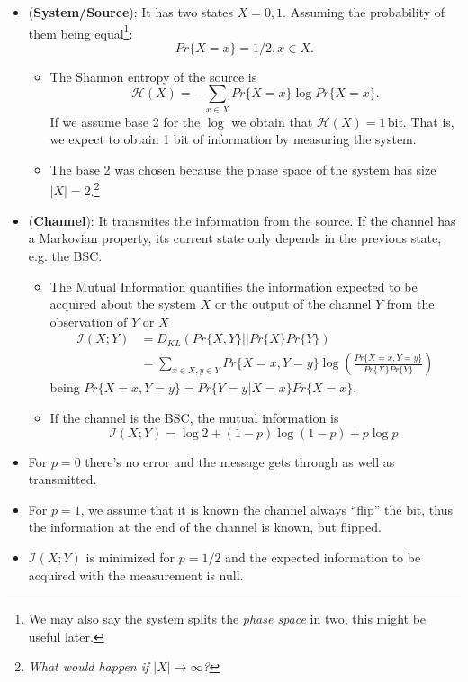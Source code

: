 \documentclass[11pt]{amsart}
\begin{document}
\begin{itemize}
\item ({\bf System/Source}): It has two states $X = {0,1}$. Assuming the probability of them being equal\footnote{We may also say the system splits the {\it phase space} in two, this might be useful later.}:
$$Pr\{X = x\} = 1/2, x \in X.$$
\begin{itemize}
\item The Shannon entropy of the source is 
$$\mathcal{H}(X) = -\sum_{x \in X} Pr\{X=x\} \log Pr\{X=x\}.$$
If we assume base 2 for the $\log$ we obtain that $\mathcal{H}(X) = 1 \, \text{bit}$. That is, we expect to obtain 1 bit of information by measuring the system.
\item The base 2 was chosen because the phase space of the system has size $|X|=2$.\footnote{{\it What would happen if $|X| \rightarrow\infty$?}}
\end{itemize}

\item ({\bf Channel}): It transmites the information from the source. If the channel has a Markovian property, its current state only depends in the previous state, e.g. the BSC.

\begin{itemize}
\item The Mutual Information quantifies the information expected to be acquired about the system $X$ or the output of the channel $Y$ from the observation of $Y$ or $X$
%
$$\begin{aligned}
\mathcal{I}(X;Y) &= D_{KL}(Pr\{X,Y\}||Pr\{X\}Pr\{Y\}) \\
&= \sum_{x \in X, y \in Y} Pr\{X=x, Y=y\} \log \left( \frac{Pr\{X=x, Y=y\}}{Pr\{X\}Pr\{Y\}} \right)
\end{aligned}
$$
being $Pr\{X=x, Y=y\} = Pr\{Y=y | X=x\} Pr\{X=x\}$.

\item If the channel is the BSC, the mutual information is
$$\mathcal{I}(X;Y) = \log 2 + (1-p) \log (1-p) + p \log p.$$
\end{itemize}

\item For $p=0$ there's no error and the message gets through as well as transmitted.
\item For $p=1$, we assume that it is known the channel always ``flip'' the bit, thus the information at the end of the channel is known, but flipped.
\item $\mathcal{I}(X;Y)$ is minimized for $p=1/2$ and the expected information to be acquired with the measurement is null.
\end{itemize}
\end{document}
